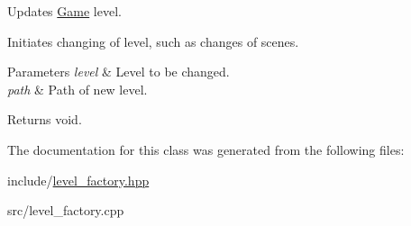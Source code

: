 Updates \hyperlink{class_game}{Game} level. 

Initiates changing of level, such as changes of scenes.


\begin{DoxyParams}{Parameters}
{\em level} & Level to be changed. \\
\hline
{\em path} & Path of new level. \\
\hline
\end{DoxyParams}
\begin{DoxyReturn}{Returns}
void. 
\end{DoxyReturn}


The documentation for this class was generated from the following files\+:\begin{DoxyCompactItemize}
\item 
include/\hyperlink{level__factory_8hpp}{level\+\_\+factory.\+hpp}\item 
src/level\+\_\+factory.\+cpp\end{DoxyCompactItemize}
